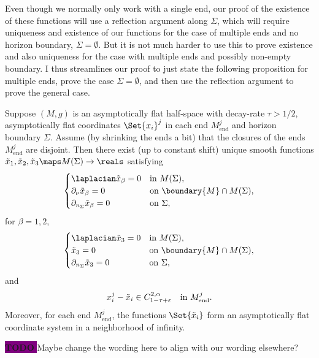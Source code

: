 \documentclass[titlepage,numbers=noenddot,headinclude,oneside,%
footinclude=true,cleardoublepage=empty,%
BCOR=5mm,paper=a4,fontsize=11pt,%
english,%
]{scrartcl}
\newcommand{\Mend}{M_{\mathrm{end}}} %
\newcommand{\todomark}{%
    \colorbox{purple}{%
        \textnormal\ttfamily\bfseries\color{white}%
        TODO%
    }%
}
\newcommand{\todo}[1][]{%
    \ifstrempty{#1}{%
        \def\todotext{Todo}%
    }{%
        \def\todotext{Todo: #1}%
    }%
    \todomark%
    {%
        \marginpar{%
            \raggedright\normalfont\sffamily\scriptsize\todotext%
        }%
    }%
}
\begin{document}
Even though we normally only work with a single end, our proof of the existence of these functions will use a reflection argument along \( \Sigma \), which will require uniqueness and existence of our functions for the case of multiple ends and no horizon boundary, \ie \( \Sigma=\emptyset \). But it is not much harder to use this to prove existence and also uniqueness for the case with multiple ends and possibly non-empty boundary. I thus streamlines our proof to just state the following proposition for multiple ends, prove the case \( \Sigma=\emptyset \), and then use the reflection argument to prove the general case.
\begin{proposition}\label{prop:existence_and_uniqueness}
    Suppose \( (M,g) \) is an asymptotically flat half-space with decay-rate \( \tau>1/2 \), asymptotically flat coordinates \( \Set{x_i}^j \) in each end \( \Mend^j \) and horizon boundary \( \Sigma \). Assume (\eg by shrinking the ends a bit) that the closures of the ends \( \Mend^j \) are disjoint. Then there exist (up to constant shift) unique smooth functions \( \tilde{x}_1,\tilde{x}_2,\tilde{x}_3\maps M(\Sigma)\to \reals \) satisfying
    \begin{equation*}
        \begin{cases}
            \laplacian \tilde{x}_\beta=0& \text{in \( M(\Sigma) \)},\\
            \partial_\nu \tilde{x}_\beta=0& \text{on \( \boundary{M}\cap M(\Sigma) \)},\\
            \partial_{n_\Sigma}\tilde{x}_\beta=0&\text{on \( \Sigma \)},
        \end{cases}
    \end{equation*}
    for \( \beta=1,2 \),
    \begin{equation*}
        \begin{cases}
            \laplacian \tilde{x}_3=0& \text{in \( M(\Sigma) \)},\\
            \tilde{x}_3=0& \text{on \( \boundary{M}\cap M(\Sigma) \)},\\
            \partial_{n_{\Sigma}}\tilde{x}_3=0& \text{on \( \Sigma \)},
        \end{cases}
    \end{equation*}
    and
    \begin{equation*}
        x_i^j-\tilde{x}_i\in C_{1-\tau+\varepsilon}^{2,\alpha} \quad \text{in \( \Mend^j \)}.
    \end{equation*}
    Moreover, for each end \( \Mend^j \), the functions \( \Set{\tilde{x}_i} \) form an asymptotically flat coordinate system in a neighborhood of infinity.
    
    \todo{Maybe change the wording here to align with our wording elsewhere?}
\end{proposition} 
\end{document}
